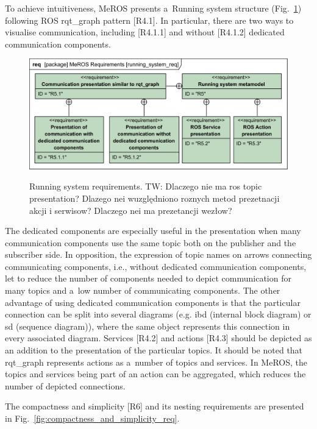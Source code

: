 \documentclass[11pt,oneside,a4paper]{report}
\newcommand{\twci}[1]{
	\textcolor{amber}{TW: #1}}
\begin{document}
	To achieve intuitiveness, MeROS presents a~Running system structure (Fig.~\ref{fig:running_system_req}) following ROS rqt\_graph pattern [R4.1]. In particular, there are two ways to visualise communication, including [R4.1.1] and without [R4.1.2]
	dedicated communication components.
	\begin{figure}[H]
		\centering
		\begin{center}
			{\includegraphics[scale=1.0]{diagrams/running_system_req.png}}
		\end{center}
		\caption{Running system requirements. \twci{Dlaczego nie ma ros topic presentation? Dlazego nei wuzględniono roznych metod prezetnacji akcji i serwisow? Dlaczego nei ma prezetancji wezłow?}} 
		\label{fig:running_system_req}
	\end{figure}
	 The dedicated components are especially useful in the presentation when many communication components use the same topic both on the publisher and the subscriber side. In opposition, the expression of topic names on arrows connecting communicating components, i.e., without dedicated communication components, let to reduce the number of components needed to depict communication for many topics and a~low number of communicating components. The other advantage of using dedicated communication components is that the particular connection can be split into several diagrams (e.g. ibd (internal block diagram) or sd (sequence diagram)), where the same object represents this connection in every associated diagram. Services [R4.2] and actions [R4.3] should be depicted as an addition to the presentation of the particular topics. It should be noted that rqt\_graph represents actions as a~number of topics and services. In MeROS, the topics and services being part of an action can be aggregated, which reduces the number of depicted connections.
		
	\pagebreak
			
	The compactness and simplicity [R6] and its nesting requirements are presented in Fig.~\ref{fig:compactness_and_simplicity_req}. 
	
\end{document}
